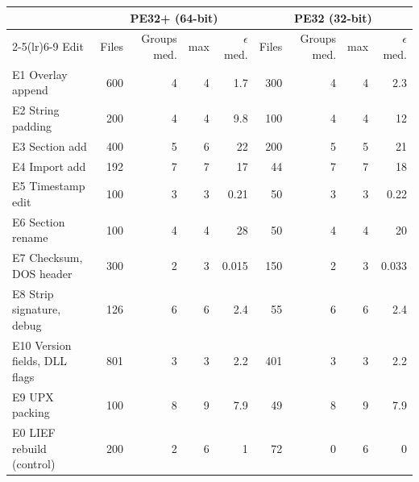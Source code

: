 \begin{tabular}{lrrrrrrrr}
\toprule
 & \multicolumn{4}{c}{PE32+ (64-bit)} & \multicolumn{4}{c}{PE32 (32-bit)} \\
\cmidrule(lr){2-5}\cmidrule(lr){6-9}
Edit & Files & Groups med. & max & $\epsilon$ med. & Files & Groups med. & max & $\epsilon$ med. \\
\midrule
E1 Overlay append & 600 & 4 & 4 & 1.7 & 300 & 4 & 4 & 2.3 \\
E2 String padding & 200 & 4 & 4 & 9.8 & 100 & 4 & 4 & 12 \\
E3 Section add & 400 & 5 & 6 & 22 & 200 & 5 & 5 & 21 \\
E4 Import add & 192 & 7 & 7 & 17 & 44 & 7 & 7 & 18 \\
E5 Timestamp edit & 100 & 3 & 3 & 0.21 & 50 & 3 & 3 & 0.22 \\
E6 Section rename & 100 & 4 & 4 & 28 & 50 & 4 & 4 & 20 \\
E7 Checksum, DOS header & 300 & 2 & 3 & 0.015 & 150 & 2 & 3 & 0.033 \\
E8 Strip signature, debug & 126 & 6 & 6 & 2.4 & 55 & 6 & 6 & 2.4 \\
E10 Version fields, DLL flags & 801 & 3 & 3 & 2.2 & 401 & 3 & 3 & 2.2 \\
E9 UPX packing & 100 & 8 & 9 & 7.9 & 49 & 8 & 9 & 7.9 \\
E0 LIEF rebuild (control) & 200 & 2 & 6 & 1 & 72 & 0 & 6 & 0 \\
\bottomrule
\end{tabular}